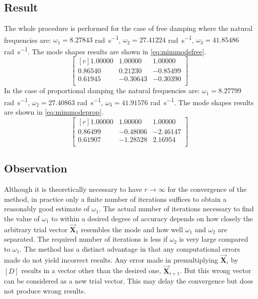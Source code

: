\subsection{Result}\label{ssec:resultmim}
The whole procedure is performed for the case of free damping where the natural
frequencies are: \(\omega_{1} = 8.27843\) \si{\radian\per\second}, \(\omega_{2}
= 27.41224\) \si{\radian\per\second}, \(\omega_{3} = 41.85486\)
\si{\radian\per\second}.
The mode shapes results are shown in \eqref{eq:mimmodefree}.
\begin{equation}\label{eq:mimmodefree}
 \begin{bmatrix*}[r]
	1.00000 & 1.00000 & 1.00000 \\
	0.86540 & 0.21230 &-0.85499 \\
	0.61945 &-0.30643 &-0.30390 \\
	 \end{bmatrix*}
\end{equation}
%
In the case of proportional damping the natural frequencies are:
\(\omega_{1} = 8.27799\) \si{\radian\per\second}, \(\omega_{2} = 27.40863\)
\si{\radian\per\second}, \(\omega_{3} = 41.91576\) \si{\radian\per\second}.
The mode shapes results are shown in \eqref{eq:mimmodeprop}.
 \begin{equation}\label{eq:mimmodeprop}
 \begin{bmatrix*}[r]
	1.00000 & 1.00000 & 1.00000 \\
	0.86499 &-0.48006 &-2.46147 \\
	0.61907 &-1.28528 & 2.16954 \\
	 \end{bmatrix*}
\end{equation}
\subsection{Observation}\label{ssec:observationmim}
Although it is theoretically necessary to have \(r\rightarrow\infty\) for the 
convergence of the method, in practice only a finite number of iterations
suffices to obtain a reasonably good estimate of \(\omega_{1}\).
The actual number of iterations necessary to find the value of \(\omega_1\) to
within a desired degree of accuracy depends on how closely the arbitrary trial
vector \(\vec{\mathbf{X}}_{1}\) resembles the mode and how well \(\omega_1\)
and \(\omega_2\) are separated.
The required number of iterations is less if \(\omega_2\) is very large compared
to \(\omega_{1}\).
The method has a distinct advantage in that any computational errors made do not
yield incorrect results. Any error made in premultiplying
\(\vec{\mathbf{X}}_{i}\) by \([D]\) results in a vector other than the desired
one, \(\vec{\mathbf{X}}_{i+1}\).
But this wrong vector can be considered as a new trial vector.
This may delay the convergence but does not produce wrong results.
